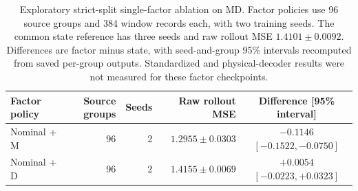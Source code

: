 \begin{table}[t]
\centering
\caption{Exploratory strict-split single-factor ablation on MD. Factor policies use 96 source groups and 384 window records each, with two training seeds. The common state reference has three seeds and raw rollout MSE $1.4101\pm0.0092$. Differences are factor minus state, with seed-and-group 95\% intervals recomputed from saved per-group outputs. Standardized and physical-decoder results were not measured for these factor checkpoints.}
\label{tab:factor}
\footnotesize
\setlength{\tabcolsep}{5pt}
\renewcommand{\arraystretch}{1.12}
\begin{tabular}{lrrrc}
\toprule
Factor policy & Source groups & Seeds & Raw rollout MSE & Difference [95\% interval] \\
\midrule
Nominal + M & 96 & 2 & $1.2955\pm0.0303$ & $-0.1146$ $[-0.1522,-0.0750]$ \\
Nominal + D & 96 & 2 & $1.4155\pm0.0069$ & $+0.0054$ $[-0.0223,+0.0323]$ \\
\bottomrule
\end{tabular}
\end{table}
